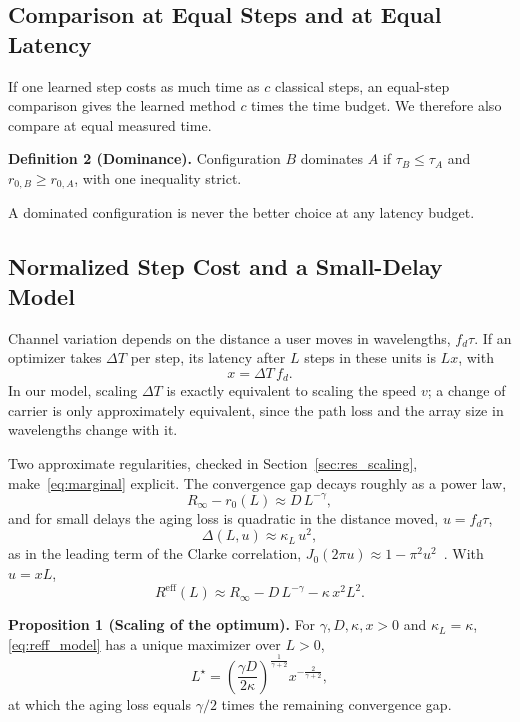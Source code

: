 \subsection{Comparison at Equal Steps and at Equal Latency}
If one learned step costs as much time as $c$ classical steps, an equal-step comparison gives the learned method $c$ times the time budget. We therefore also compare at equal measured time.

\textbf{Definition 2 (Dominance).} Configuration $B$ dominates $A$ if $\tau_B\le\tau_A$ and $r_{0,B}\ge r_{0,A}$, with one inequality strict.

A dominated configuration is never the better choice at any latency budget.

\subsection{Normalized Step Cost and a Small-Delay Model}
Channel variation depends on the distance a user moves in wavelengths, $f_d\tau$. If an optimizer takes $\Delta T$ per step, its latency after $L$ steps in these units is $Lx$, with
\begin{equation}
    x = \Delta T\, f_d .
    \label{eq:x}
\end{equation}
In our model, scaling $\Delta T$ is exactly equivalent to scaling the speed $v$; a change of carrier is only approximately equivalent, since the path loss and the array size in wavelengths change with it.

Two approximate regularities, checked in Section~\ref{sec:res_scaling}, make~\eqref{eq:marginal} explicit. The convergence gap decays roughly as a power law,
\begin{equation}
    R_\infty - r_0(L) \approx D\,L^{-\gamma},
    \label{eq:conv_law}
\end{equation}
and for small delays the aging loss is quadratic in the distance moved, $u=f_d\tau$,
\begin{equation}
    \Delta(L,u) \approx \kappa_L\, u^2 ,
    \label{eq:aging_law}
\end{equation}
as in the leading term of the Clarke correlation, $J_0(2\pi u)\approx 1-\pi^2u^2$~\cite{Clarke1968BSTJ}. With $u = xL$,
\begin{equation}
    R^{\mathrm{eff}}(L) \approx R_\infty - D\,L^{-\gamma} - \kappa\, x^2 L^2 .
    \label{eq:reff_model}
\end{equation}

\textbf{Proposition 1 (Scaling of the optimum).} For $\gamma, D, \kappa, x > 0$ and $\kappa_L=\kappa$, \eqref{eq:reff_model} has a unique maximizer over $L>0$,
\begin{equation}
    L^\star = \left(\frac{\gamma D}{2\kappa}\right)^{\frac{1}{\gamma+2}} x^{-\frac{2}{\gamma+2}} ,
    \label{eq:Lstar}
\end{equation}
at which the aging loss equals $\gamma/2$ times the remaining convergence gap.

